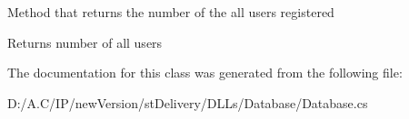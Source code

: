 Method that returns the number of the all users registered 

\begin{DoxyReturn}{Returns}
number of all users
\end{DoxyReturn}


The documentation for this class was generated from the following file\+:\begin{DoxyCompactItemize}
\item 
D\+:/\+A.\+C/\+I\+P/new\+Version/st\+Delivery/\+D\+L\+Ls/\+Database/Database.\+cs\end{DoxyCompactItemize}

